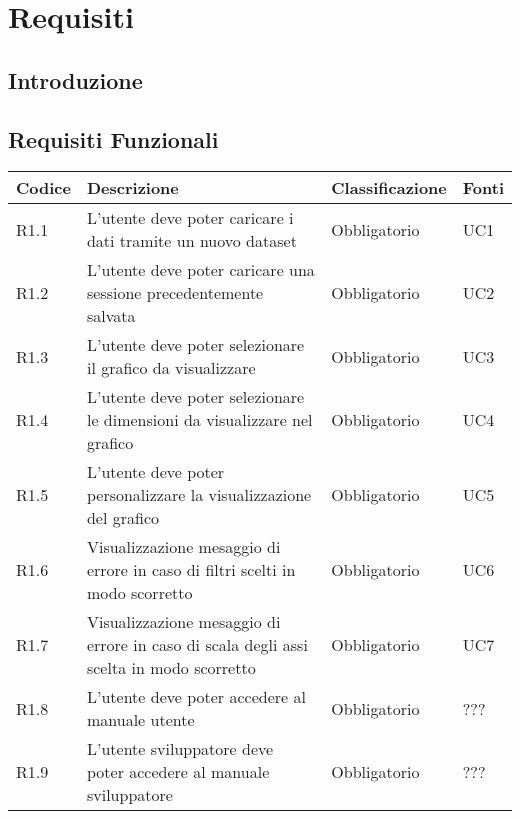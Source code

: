 \chapter{Requisiti}


\section{Introduzione}
\section{Requisiti Funzionali}
\begin{table}[H]
  \centering
  \begin{tabular}{|p{}|p{6cm}|p{3cm}|p{2cm}|}
    \hline
    \rowcolor[HTML]{036400}
    {\color[HTML]{FFFFFF} \textbf{Codice}} & {\color[HTML]{FFFFFF} \textbf{Descrizione}} & {\color[HTML]{FFFFFF} \textbf{Classificazione}} & {\color[HTML]{FFFFFF} \textbf{Fonti}} \\ \hline
    \rowcolor[HTML]{EFEFEF}
    R1.1 & L'utente deve poter caricare i dati tramite un nuovo dataset & Obbligatorio & UC1 \\ \hline
    \rowcolor[HTML]{C0C0C0}
    R1.2 & L'utente deve poter caricare una sessione precedentemente salvata & Obbligatorio & UC2 \\ \hline
    \rowcolor[HTML]{EFEFEF}
    R1.3 & L'utente deve poter selezionare il grafico da visualizzare & Obbligatorio & UC3 \\ \hline
    \rowcolor[HTML]{C0C0C0}
    R1.4 & L'utente deve poter selezionare le dimensioni da visualizzare nel grafico & Obbligatorio & UC4 \\ \hline
    \rowcolor[HTML]{EFEFEF}
    R1.5 & L'utente deve poter personalizzare la visualizzazione del grafico & Obbligatorio & UC5 \\ \hline
    \rowcolor[HTML]{C0C0C0}
    R1.6 & Visualizzazione mesaggio di errore in caso di filtri scelti in modo scorretto & Obbligatorio & UC6 \\ \hline
    \rowcolor[HTML]{EFEFEF}
    R1.7 & Visualizzazione mesaggio di errore in caso di scala degli assi scelta in modo scorretto & Obbligatorio & UC7 \\ \hline
    \rowcolor[HTML]{C0C0C0}
    R1.8 & L'utente deve poter accedere al manuale utente & Obbligatorio & ??? \\ \hline
    \rowcolor[HTML]{EFEFEF}
    R1.9 & L'utente sviluppatore deve poter accedere al manuale sviluppatore & Obbligatorio & ??? \\ \hline

\end{tabular}
\end{table}
